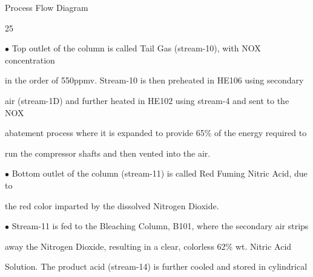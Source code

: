 \documentclass[a4paper,portrait,12pt]{article}
\begin{document}
\begin{flushleft}
\newpage
Process Flow Diagram
\end{flushleft}





25





\begin{flushleft}
$\bullet$ Top outlet of the column is called Tail Gas (stream-10), with NOX concentration
\end{flushleft}


\begin{flushleft}
in the order of 550ppmv. Stream-10 is then preheated in HE106 using secondary
\end{flushleft}


\begin{flushleft}
air (stream-1D) and further heated in HE102 using stream-4 and sent to the NOX
\end{flushleft}


\begin{flushleft}
abatement process where it is expanded to provide 65\% of the energy required to
\end{flushleft}


\begin{flushleft}
run the compressor shafts and then vented into the air.
\end{flushleft}


\begin{flushleft}
$\bullet$ Bottom outlet of the column (stream-11) is called Red Fuming Nitric Acid, due to
\end{flushleft}


\begin{flushleft}
the red color imparted by the dissolved Nitrogen Dioxide.
\end{flushleft}


\begin{flushleft}
$\bullet$ Stream-11 is fed to the Bleaching Column, B101, where the secondary air strips
\end{flushleft}


\begin{flushleft}
away the Nitrogen Dioxide, resulting in a clear, colorless 62\% wt. Nitric Acid
\end{flushleft}


\begin{flushleft}
Solution. The product acid (stream-14) is further cooled and stored in cylindrical
\end{flushleft}
\end{document}
